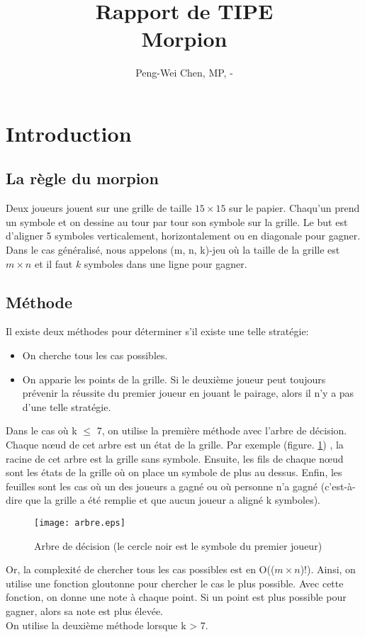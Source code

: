 \documentclass[12pt, a4paper]{article}
\title{Rapport de TIPE\\
Morpion}
\author{Peng-Wei Chen, MP, \oldstylenums{2017}-\oldstylenums{2018}}
\begin{document}
\maketitle

\section{Introduction}
\subsection{La règle du morpion}
Deux joueurs jouent sur une grille de taille $15 \times 15$ sur le papier. Chaqu'un prend un symbole et on dessine au tour par tour son symbole sur la grille. Le but est d'aligner 5 symboles verticalement, horizontalement ou en diagonale pour gagner.
Dans le cas généralisé, nous appelons (m, n, k)-jeu où la taille de la grille est $m \times n$ et il faut $k$ symboles dans une ligne pour gagner.
\subsection{Méthode}
Il existe deux méthodes pour déterminer s'il existe une telle stratégie:
\begin{itemize}
    \item On cherche tous les cas possibles.
    \item On apparie les points de la grille. Si le deuxième joueur peut toujours prévenir la réussite du premier joueur en jouant le pairage, alors il n'y a pas d'une telle stratégie.
\end{itemize}

Dans le cas où k $\le$ 7, on utilise la première méthode avec l'arbre de décision. Chaque nœud de cet arbre est un état de la grille. Par exemple (figure. \ref{fig:arbre}) , la racine de cet arbre est la grille sans symbole. Ensuite, les fils de chaque nœud sont les états de la grille où on place un symbole de plus au dessus. Enfin, les feuilles sont les cas où un des joueurs a gagné ou où personne n'a gagné (c'est-à-dire que la grille a été remplie et que aucun joueur a aligné k symboles).

\begin{figure}[t]
\centering
\texttt{[image: arbre.eps]}
\caption{Arbre de décision (le cercle noir est le symbole du premier joueur)} \label{fig:arbre}
\end{figure}

Or, la complexité de chercher tous les cas possibles est en O(($m \times n$)!). Ainsi, on utilise une fonction gloutonne pour chercher le cas le \og plus \fg possible. Avec cette fonction, on donne une note à chaque point. Si un point est plus possible pour gagner, alors sa note est plus élevée.
\\
On utilise la deuxième méthode lorsque k > 7.
\end{document}
